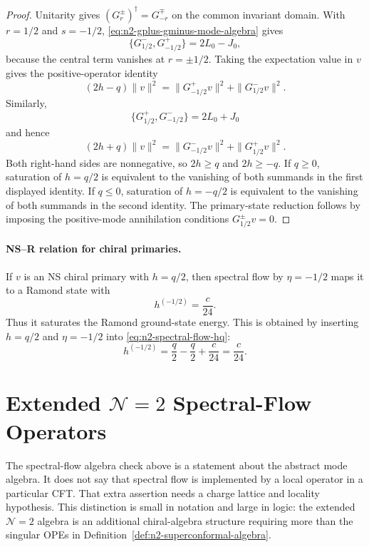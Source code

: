 \begin{proof}
Unitarity gives \((G^\pm_r)^\dagger=G^\mp_{-r}\) on the common invariant
domain.  With \(r=1/2\) and \(s=-1/2\),
\eqref{eq:n2-gplus-gminus-mode-algebra} gives
\[
  \{G^-_{1/2},G^+_{-1/2}\}
  =
  2L_0-J_0,
\]
because the central term vanishes at \(r=\pm1/2\).  Taking the expectation
value in \(v\) gives the positive-operator identity
\[
  (2h-q)\|v\|^2
  =
  \|G^+_{-1/2}v\|^2
  +
  \|G^-_{1/2}v\|^2 .
\]
Similarly,
\[
  \{G^+_{1/2},G^-_{-1/2}\}
  =
  2L_0+J_0
\]
and hence
\[
  (2h+q)\|v\|^2
  =
  \|G^-_{-1/2}v\|^2
  +
  \|G^+_{1/2}v\|^2 .
\]
Both right-hand sides are nonnegative, so \(2h\ge q\) and \(2h\ge -q\).
If \(q\ge0\), saturation of \(h=q/2\) is equivalent to the vanishing of both
summands in the first displayed identity.  If \(q\le0\), saturation of
\(h=-q/2\) is equivalent to the vanishing of both summands in the second
identity.  The primary-state reduction follows by imposing the positive-mode
annihilation conditions \(G^\pm_{1/2}v=0\).
\end{proof}

\paragraph{NS--R relation for chiral primaries.}
If \(v\) is an NS chiral primary with \(h=q/2\), then spectral flow by
\(\eta=-1/2\) maps it to a Ramond state with
\begin{equation}
  h^{(-1/2)}=\frac c{24}.
  \label{eq:n2-chiral-to-ramond-ground}
\end{equation}
Thus it saturates the Ramond ground-state energy.
This is obtained by inserting \(h=q/2\) and \(\eta=-1/2\) into
\eqref{eq:n2-spectral-flow-hq}:
\[
  h^{(-1/2)}
  =
  \frac q2-\frac q2+\frac c{24}
  =
  \frac c{24}.
\]

\section{Extended \texorpdfstring{\(\mathcal N=2\)}{N=2} Spectral-Flow Operators}
\label{sec:extended-n2-spectral-flow-operators}

The spectral-flow algebra check above is a statement about the abstract mode
algebra.  It does not say that spectral flow is implemented by a local
operator in a particular CFT.  That extra assertion needs a charge lattice and
locality hypothesis.  This distinction is small in notation and large in
logic: the extended \(\mathcal N=2\) algebra is an additional chiral-algebra
structure requiring more than the singular OPEs in
Definition~\ref{def:n2-superconformal-algebra}.

